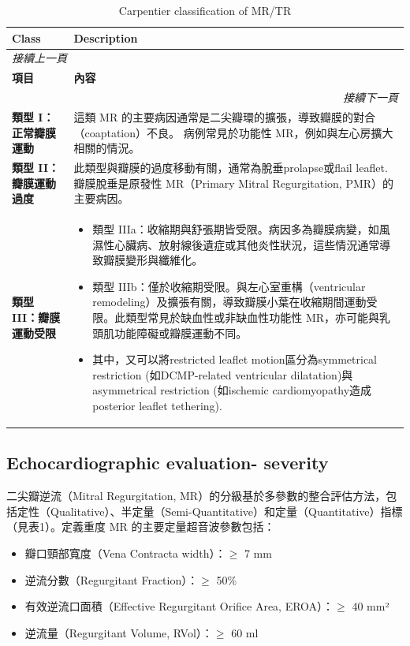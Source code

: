 \documentclass[nols]{tufte-book}
\begin{document}
\begin{longtable}{p{3cm} p{7cm}}
\caption{Carpentier classification of MR/TR}\\
\hline
\textbf{Class} & \textbf{Description} \\
\hline
\endfirsthead
\multicolumn{2}{l}{\textit{接續上一頁}} \\
\hline
\textbf{項目} & \textbf{內容} \\
\hline
\endhead
\hline \multicolumn{2}{r}{\textit{接續下一頁}} \\
\endfoot
\endlastfoot

\textbf{類型 I：正常瓣膜運動} & 
這類 MR 的主要病因通常是二尖瓣環的擴張，導致瓣膜的對合（coaptation）不良。
病例常見於功能性 MR，例如與左心房擴大相關的情況。
\\ \hline

\textbf{類型 II：瓣膜運動過度} & 
此類型與瓣膜的過度移動有關，通常為脫垂prolapse或flail leaflet. 
瓣膜脫垂是原發性 MR（Primary Mitral Regurgitation, PMR）的主要病因。
\\ \hline

\textbf{類型 III：瓣膜運動受限} &
\begin{itemize}
    \item 類型 IIIa：收縮期與舒張期皆受限。病因多為瓣膜病變，如風濕性心臟病、放射線後遺症或其他炎性狀況，這些情況通常導致瓣膜變形與纖維化。
    \item 類型 IIIb：僅於收縮期受限。與左心室重構（ventricular remodeling）及擴張有關，導致瓣膜小葉在收縮期間運動受限。此類型常見於缺血性或非缺血性功能性 MR，亦可能與乳頭肌功能障礙或瓣膜運動不同。
    \item 其中，又可以將restricted leaflet motion區分為symmetrical restriction (如DCMP-related ventricular dilatation)與asymmetrical restriction (如ischemic cardiomyopathy造成posterior leaflet tethering). 
\end{itemize}
\\ \hline


\end{longtable}


\subsection{Echocardiographic evaluation- severity}
二尖瓣逆流（Mitral Regurgitation, MR）的分級基於多參數的整合評估方法，包括定性（Qualitative）、半定量（Semi-Quantitative）和定量（Quantitative）指標（見表1）。定義重度 MR 的主要定量超音波參數包括：

\begin{itemize}
    \item 瓣口頸部寬度（Vena Contracta width）：$\geq$ 7 mm
    \item 逆流分數（Regurgitant Fraction）：$\geq$ 50\%
    \item 有效逆流口面積（Effective Regurgitant Orifice Area, EROA）：$\geq$ 40 mm²
    \item 逆流量（Regurgitant Volume, RVol）：$\geq$ 60 ml
\end{itemize}
\end{document}
